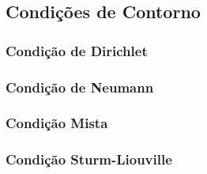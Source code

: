 \subsection{Condições de Contorno}

\subsubsection{Condição de Dirichlet}

\subsubsection{Condição de Neumann}

\subsubsection{Condição Mista}

\subsubsection{Condição Sturm-Liouville}